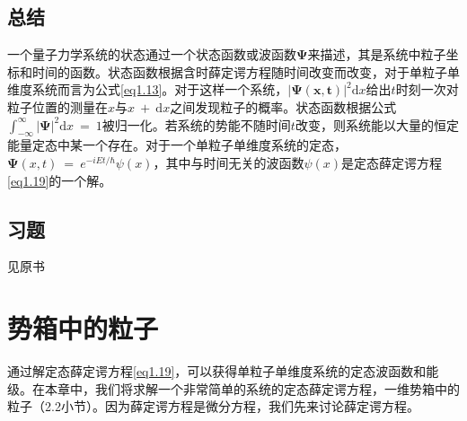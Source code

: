 \documentclass[12pt,a4paper,openany]{ctexbook}
\begin{document}
\section*{总结}
\begin{flushleft}
一个量子力学系统的状态通过一个状态函数或波函数$\bm{\Psi}$来描述，其是系统中粒子坐标和时间的函数。状态函数根据含时薛定谔方程随时间改变而改变，对于单粒子单维度系统而言为公式\eqref{eq1.13}。对于这样一个系统，$\left|\bm{\Psi(x,t)}\right|^2\mathrm{d}x$给出$t$时刻一次对粒子位置的测量在$x$与$x\ +\ \mathrm{d}x$之间发现粒子的概率。状态函数根据公式$\int_{-\infty}^{\infty}\left|\bm{\Psi}\right|^2\mathrm{d}x\ =\ 1$被归一化。若系统的势能不随时间$t$改变，则系统能以大量的恒定能量定态中某一个存在。对于一个单粒子单维度系统的定态，$\bm{\Psi}(x,t)\ =\ e^{-iEt/\hbar}\psi(x)$，其中与时间无关的波函数$\psi(x)$是定态薛定谔方程\eqref{eq1.19}的一个解。
\end{flushleft}
\section*{习题}
见原书

\chapter{势箱中的粒子}
\begin{flushleft}
通过解定态薛定谔方程\eqref{eq1.19}，可以获得单粒子单维度系统的定态波函数和能级。在本章中，我们将求解一个非常简单的系统的定态薛定谔方程，一维势箱中的粒子（2.2小节）。因为薛定谔方程是微分方程，我们先来讨论薛定谔方程。
\end{flushleft}
\end{document}
